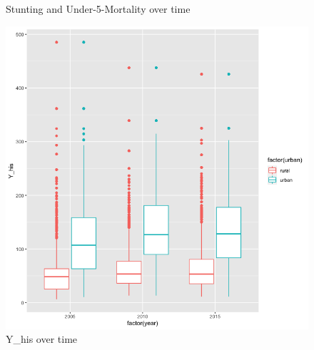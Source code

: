 \documentclass[a4paper, 11pt]{article} %
\begin{document}
\begin{figure}[h!]
    \centering
    \qquad
    \caption{Stunting and Under-5-Mortality over time}%
    \label{fig:stunting_dead5_proportion}%
\end{figure}

\begin{figure}[h!]
    \centering
    \includegraphics[scale=0.4]{figures/income_over_time} 
    \caption{Y\_his over time}
    \label{fig:income_over_time}
\end{figure}
\end{document}
